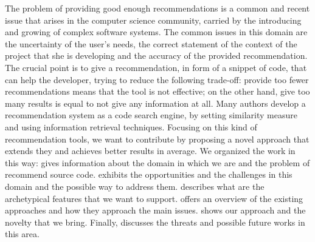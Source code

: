 The problem of providing good enough recommendations is a common and recent issue that arises in the computer science community, carried by the introducing and growing of complex software systems. The common issues in this domain are the uncertainty of the user's needs, the correct statement of the context of the project that she is developing and the accuracy of the provided recommendation. The crucial point is to give a recommendation, in form of a snippet of code, that can help the developer, trying to reduce the following trade-off: provide too fewer recommendations means that the tool is not effective; on the other hand, give too many results is equal to not give any information at all. Many authors develop a recommendation system as a code search engine, by setting similarity measure and using information retrieval techniques. Focusing on this kind of recommendation tools, we want to contribute by proposing a novel approach that extends they and achieves better results in average.
We organized the work in this way:   gives information about the domain in which we are and the problem of recommend source code.  exhibits the opportunities and the challenges in this domain and the possible way to address them.
 describes what are the archetypical features that we want to support.   offers an overview of the existing approaches and how they approach the main issues.  shows our approach and the novelty that we bring.  Finally,   discusses the threats and possible future works in this area. 
